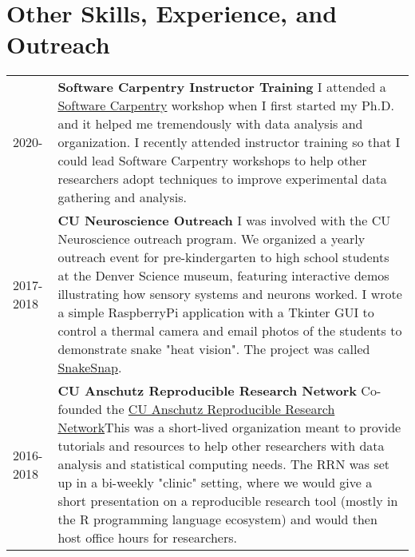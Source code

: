 \documentclass[11pt]{article}
\begin{document}
\section*{Other Skills, Experience, and Outreach}
\label{sec:org7b75295}
\begin{tabular}{lp{}}
2020-& \textbf{Software Carpentry Instructor Training} \newline I attended a \href{https://software-carpentry.org/}{Software Carpentry} workshop when I first started my Ph.D. and it helped me tremendously with data analysis and organization. I recently attended instructor training so that I could lead Software Carpentry workshops to help other researchers adopt techniques to improve experimental data gathering and analysis.\\
2017-2018& \textbf{CU Neuroscience Outreach}\newline
I was involved with the CU Neuroscience outreach program. We organized a yearly outreach event for pre-kindergarten to high school students at the Denver Science museum, featuring interactive demos illustrating how sensory systems and neurons worked. I wrote a simple RaspberryPi application with a Tkinter GUI to control a thermal camera and email photos of the students to demonstrate snake "heat vision". The project was called \href{https://github.com/nkicg6/thermalsnap}{SnakeSnap}.\\
2016-2018& \textbf{CU Anschutz Reproducible Research Network} \newline Co-founded the \href{https://ucd-reproducible-research-clinic.github.io/members.html}{CU Anschutz Reproducible Research Network}\newline This was a short-lived organization meant to provide tutorials and resources to help other researchers with data analysis and statistical computing needs. The RRN was set up in a bi-weekly "clinic" setting, where we would give a short presentation on a reproducible research tool (mostly in the R programming language ecosystem) and would then host office hours for researchers.\\
\end{tabular}
\end{document}
